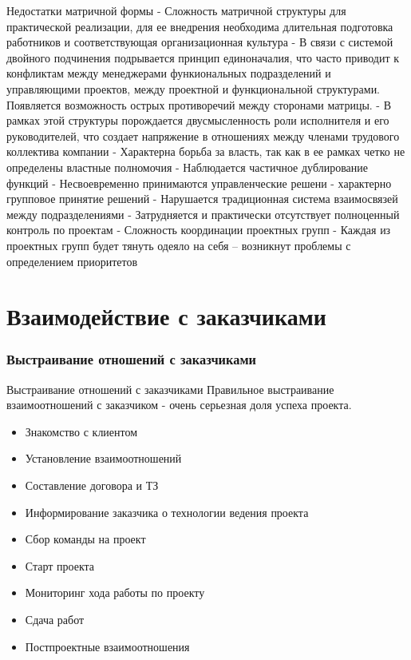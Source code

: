 \documentclass{../industrial-development}
\begin{document}
\lecturenotes
Недостатки матричной формы
- Сложность матричной структуры для практической реализации, для ее внедрения необходима длительная подготовка работников и соответствующая организационная культура
- В связи с системой двойного подчинения подрывается принцип единоначалия, что часто приводит к конфликтам между менеджерами функиональных подразделений и управляющими проектов, между проектной и функциональной структурами. Появляется возможность острых противоречий между сторонами матрицы.
- В рамках этой структуры порождается двусмысленность роли исполнителя и его руководителей, что создает напряжение в отношениях между членами трудового коллектива компании
- Характерна борьба за власть, так как в ее рамках четко не определены властные полномочия
- Наблюдается частичное дублирование функций
- Несвоевременно принимаются управленческие решени - характерно групповое принятие решений
- Нарушается традиционная система взаимосвязей между подразделениями
- Затрудняется и практически отсутствует полноценный контроль по проектам
- Сложность координации проектных групп
- Каждая из проектных групп будет тянуть одеяло на себя – возникнут проблемы  с определением приоритетов

\section{Взаимодействие с заказчиками}

\begin{frame} \frametitle{Выстраивание отношений с заказчиками}
  \begin{block}{Выстраивание отношений с заказчиками}
Правильное выстраивание взаимоотношений с заказчиком - очень серьезная доля успеха проекта. 
  \end{block}

\begin{itemize}
 \item Знакомство с клиентом
 \item Установление взаимоотношений
 \item Составление договора и ТЗ
 \item Информирование заказчика о технологии ведения проекта
 \item Сбор команды на проект 
 \item Старт проекта 
 \item Мониторинг хода работы по проекту
 \item Сдача работ
 \item Постпроектные взаимоотношения
  \end{itemize}
\end{frame}
\end{document}
